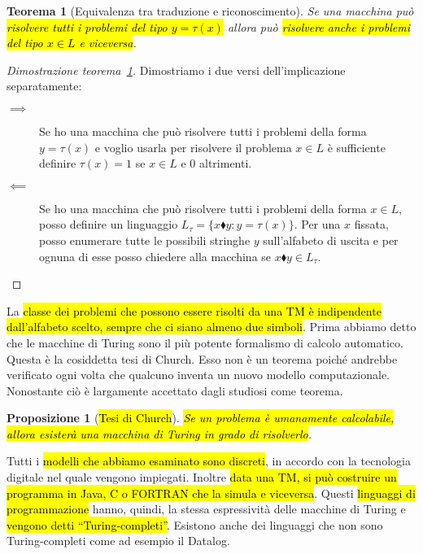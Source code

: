 \documentclass[a4paper,11pt,twoside]{article}
\theoremstyle{plain}
\newtheorem{prop}{Proposizione}[section]
\newtheorem{thm}{Teorema}[section]
\theoremstyle{definition}
\theoremstyle{remark}
\newcommand*{\termsep}[0]{\blacklozenge}
\begin{document}
\begin{thm}[Equivalenza tra traduzione e riconoscimento]\label{thm:equiv-trad-ric}
  Se una macchina può \hl{risolvere tutti i problemi del tipo $y = \tau(x)$}
  allora può \hl{risolvere anche i problemi del tipo $x \in L$ e viceversa}.
\end{thm}
\begin{proof}[Dimostrazione teorema~\ref{thm:equiv-trad-ric}]
  Dimostriamo i due versi dell'implicazione separatamente:

  \begin{description}
    \item[$\implies$] Se ho una macchina che può risolvere tutti i problemi
      della forma $y = \tau (x)$ e voglio usarla per risolvere il problema $x
      \in L$ è sufficiente definire $\tau(x) = 1$ se $x \in L$ e $0$ altrimenti.
    \item[$\impliedby$] Se ho una macchina che può risolvere tutti i problemi
      della forma $x \in L$, posso definire un linguaggio $L_{\tau} = \{
      x\termsep y : y = \tau(x) \}$. Per una $x$ fissata, posso enumerare
      tutte le possibili stringhe $y$ sull'alfabeto di uscita e per ognuna di
      esse posso chiedere alla macchina se $x\termsep y \in L_{\tau}$.
  \end{description}
\end{proof}

La \hl{classe dei problemi che possono essere risolti da una TM è indipendente
dall'alfabeto scelto, sempre che ci siano almeno due simboli}. Prima abbiamo
detto che le macchine di Turing sono il più potente formalismo di calcolo
automatico. Questa è la cosiddetta tesi di Church. Esso non è un teorema poiché
andrebbe verificato ogni volta che qualcuno inventa un nuovo modello
computazionale. Nonostante ciò è largamente accettato dagli studiosi come
teorema.

\begin{prop}[\hl{Tesi di Church}]\label{thm:tesi-church-1}
  \hl{Se un problema è umanamente calcolabile, allora esisterà una macchina di
  Turing in grado di risolverlo}.
\end{prop}

Tutti i \hl{modelli che abbiamo esaminato sono discreti}, in accordo con la
tecnologia digitale nel quale vengono impiegati. Inoltre \hl{data una TM, si può
costruire un programma in Java, C o FORTRAN che la simula e viceversa}. Questi
\hl{linguaggi di programmazione} hanno, quindi, la stessa espressività delle
macchine di Turing e \hl{vengono detti ``Turing-completi''}. Esistono anche dei
linguaggi che non sono Turing-completi come ad esempio il Datalog.
\end{document}
